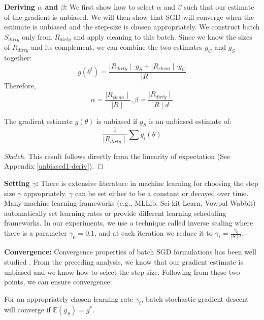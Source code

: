 \vspace{0.25em}

\noindent\textbf{Deriving $\alpha$ and $\beta$: } We first show how to select $\alpha$ and $\beta$ such that our estimate of the gradient is unbiased. 
We will then show that SGD will converge when the estimate is unbiased and the step-size is chosen appropriately.
We construct batch $S_{dirty}$ only from $R_{dirty}$ and apply cleaning to this batch.
Since we know the sizes of $R_{dirty}$ and its complement, we can combine the two estimates $g_C$ and $g_S$ together:
\[
g(\theta^{t}) = \frac{\mid R_{dirty} \mid \cdot g_S + \mid R_{clean} \mid \cdot g_C  }{\mid R \mid}
\]
Therefore,
\[
\alpha = \frac{\mid R_{clean} \mid}{\mid R \mid}, \beta = \frac{\mid R_{dirty} \mid}{\mid R \mid d}
\]

\begin{lemma}\label{unbiased1}
The gradient estimate $g(\theta)$ is unbiased if $g_S$ is an unbiased estimate of:
\[
\frac{1}{\mid R_{dirty} \mid} \sum g_i(\theta)
\]
\end{lemma}
\begin{proof}[Sketch]
This result follows directly from the linearity of expectation (See Appendix \ref{unbiased1-deriv}).
\end{proof}

\vspace{0.25em}

\noindent\textbf{ Setting $\gamma$: } There is extensive literature in machine learning for choosing the step size $\gamma$ appropriately. $\gamma$ can be set either to be a constant or decayed over time. Many machine learning frameworks (e.g., MLLib, Sci-kit Learn, Vowpal Wabbit) automatically set learning rates or provide different learning scheduling frameworks. 
In our experiments, we use a technique called inverse scaling where there is a parameter $\gamma_0=0.1$, and at each iteration we reduce it to $\gamma_t = \frac{\gamma_0}{\mid S \mid t}$. 

\vspace{0.25em}

\noindent\textbf{ Convergence: } Convergence properties of batch SGD formulations has been well studied \cite{dekel2012optimal}. From the preceding analysis, we know that our gradient estimate is unbiased and we know how to select the step size. Following from these two points, we can ensure convergence: 

\begin{proposition}
For an appropriately chosen learning rate $\gamma_t$, batch stochastic gradient descent will converge if $\mathbb{E}(g_S)=g^*$.
\label{unbiased}
\end{proposition}


